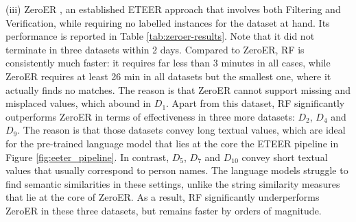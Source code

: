 
(iii) ZeroER \cite{DBLP:conf/sigmod/WuCSCT20}, an established ETEER approach that involves both Filtering and Verification, while requiring no labelled instances for the dataset at hand. Its performance is reported in Table \ref{tab:zeroer-results}. Note that it did not terminate in three datasets within 2 days.
Compared to ZeroER, RF is consistently much faster: it requires far less than 3 minutes in all cases, while ZeroER requires at least 26 min in all datasets but the smallest one, where it actually finds no matches. The reason is that ZeroER cannot support missing and misplaced values, which abound in $D_1$. Apart from this dataset, RF significantly outperforms ZeroER in terms of effectiveness in three more datasets: $D_2$, $D_4$ and $D_9$. The reason is that those datasets convey long textual values, which are ideal for the pre-trained language model that lies at the core the ETEER pipeline in Figure \ref{fig:eeter_pipeline}. In contrast, $D_5$, $D_7$ and $D_{10}$ convey short textual values that usually correspond to person names. The language models struggle to find semantic similarities in these settings, unlike the string similarity measures that lie at the core of ZeroER. As a result, RF significantly underperforms ZeroER in these three datasets, but remains faster by orders of magnitude.

